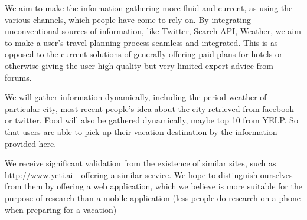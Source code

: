 We aim to make the information gathering more fluid and current, as using the various channels, which people have come to rely on. By integrating unconventional sources of information, like Twitter, Search API, Weather, we aim to make a user's travel planning process seamless and integrated. This is as opposed to the current solutions of generally offering paid plans for hotels or otherwise giving the user high quality but very limited expert advice from forums.

We will gather information dynamically, including the period weather of particular city, most recent people's idea about the city retrieved from facebook or twitter. Food will also be gathered dynamically, maybe top 10 from YELP. So that users are able to pick up their vacation destination  by the information provided here. 

We receive significant validation from the existence of similar sites, such as \url{http://www.yeti.ai} - offering a similar service. We hope to distinguish ourselves from them by offering a web application, which we believe is more suitable for the purpose of research than a mobile application (less people do research on a phone when preparing for a vacation)
